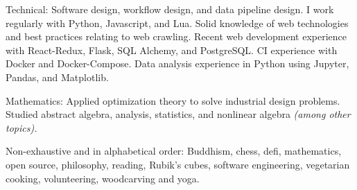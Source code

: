 \documentclass[10pt,a4paper]{article} %
\begin{document}
\inlineheadsection %
{Technical:}
{Software design, workflow design, and data pipeline design. I work regularly with Python, Javascript, and Lua. Solid knowledge of web technologies and best practices relating to web crawling. Recent web development experience with React-Redux, Flask, SQL Alchemy, and PostgreSQL. CI experience with Docker and Docker-Compose. Data analysis experience in Python using Jupyter, Pandas, and Matplotlib.}


\inlineheadsection %
{Mathematics:}
{Applied optimization theory to solve industrial design problems. Studied abstract algebra, analysis, statistics, and nonlinear algebra \textit{(among other topics).}}


\spacedhrule{1.6em}{-0.4em} %



\inlineheadsection %
{Non-exhaustive and in alphabetical order:}
{Buddhism, chess, defi, mathematics, open source, philosophy, reading, Rubik's cubes, software engineering, vegetarian cooking, volunteering, woodcarving and yoga.}

\end{document}
